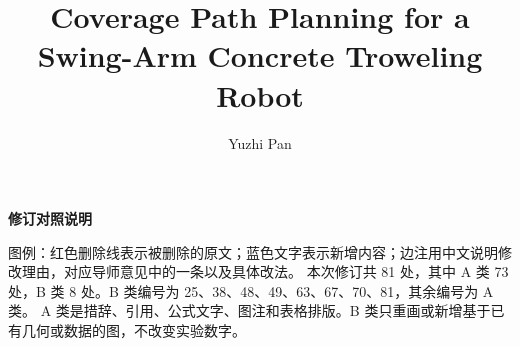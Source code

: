 \documentclass[a4paper,11pt]{article}
\title{\DIFaddbegin \DIFadd{BiRect: Bidirectional Rectangular }\DIFaddend Coverage Path Planning for a Swing-Arm Concrete Troweling Robot\DIFdelbegin \DIFdel{in Complex Environments}\DIFdelend }
\author{Yuzhi Pan}
\date{}
\begin{document}
\thispagestyle{empty}
\begin{center}
{\Large\bfseries 修订对照说明}
\end{center}
\vspace{1.2em}
\noindent 图例：红色删除线表示被删除的原文；蓝色文字表示新增内容；边注用中文说明修改理由，对应导师意见中的一条以及具体改法。
\vspace{0.8em}
\noindent 本次修订共 81 处，其中 A 类 73 处，B 类 8 处。B 类编号为 25、38、48、49、63、67、70、81，其余编号为 A 类。
\vspace{0.8em}
\noindent A 类是措辞、引用、公式文字、图注和表格排版。B 类只重画或新增基于已有几何或数据的图，不改变实验数字。
\clearpage
\maketitle
\end{document}

